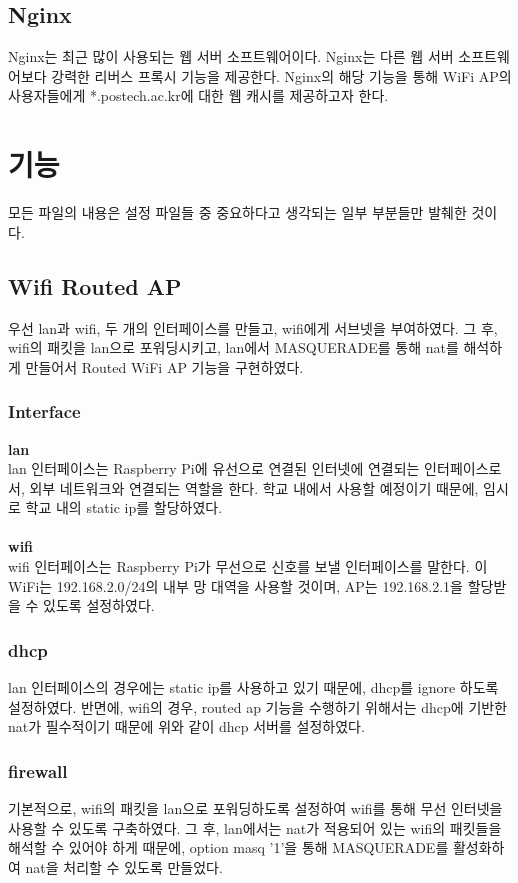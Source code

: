 \documentclass{article}
\begin{document}
    \subsection{Nginx}
     Nginx는 최근 많이 사용되는 웹 서버 소프트웨어이다. Nginx는 다른 웹 서버 소프트웨어보다 강력한 리버스 프록시 기능을 제공한다.
     Nginx의 해당 기능을 통해 WiFi AP의 사용자들에게 *.postech.ac.kr에 대한 웹 캐시를 제공하고자 한다.
    \section{기능}
    모든 파일의 내용은 설정 파일들 중 중요하다고 생각되는 일부 부분들만 발췌한 것이다.
    \subsection{Wifi Routed AP}
     우선 lan과 wifi, 두 개의 인터페이스를 만들고, wifi에게 서브넷을 부여하였다. 그 후, wifi의 패킷을 lan으로 포워딩시키고,
     lan에서 MASQUERADE를 통해 nat를 해석하게 만들어서 Routed WiFi AP 기능을 구현하였다.
    \subsubsection{Interface}
    \textbf{lan}\\
    lan 인터페이스는 Raspberry Pi에 유선으로 연결된 인터넷에 연결되는 인터페이스로서, 외부 네트워크와 연결되는 역할을 한다.
    학교 내에서 사용할 예정이기 때문에, 임시로 학교 내의 static ip를 할당하였다. \\ \\
    \textbf{wifi}\\
    wifi 인터페이스는 Raspberry Pi가 무선으로 신호를 보낼 인터페이스를 말한다. 이 WiFi는 192.168.2.0/24의 내부 망 대역을 사용할 것이며,
    AP는 192.168.2.1을 할당받을 수 있도록 설정하였다.

    \subsubsection{dhcp}
    lan 인터페이스의 경우에는 static ip를 사용하고 있기 때문에, dhcp를 ignore 하도록 설정하였다.
    반면에, wifi의 경우, routed ap 기능을 수행하기 위해서는 dhcp에 기반한 nat가 필수적이기 때문에 위와 같이 dhcp 서버를 설정하였다.

    \subsubsection{firewall}
    기본적으로, wifi의 패킷을 lan으로 포워딩하도록 설정하여 wifi를 통해 무선 인터넷을 사용할 수 있도록 구축하였다.
    그 후, lan에서는 nat가 적용되어 있는 wifi의 패킷들을 해석할 수 있어야 하게 때문에,
    option masq '1'을 통해 MASQUERADE를 활성화하여 nat을 처리할 수 있도록 만들었다.
\end{document}
